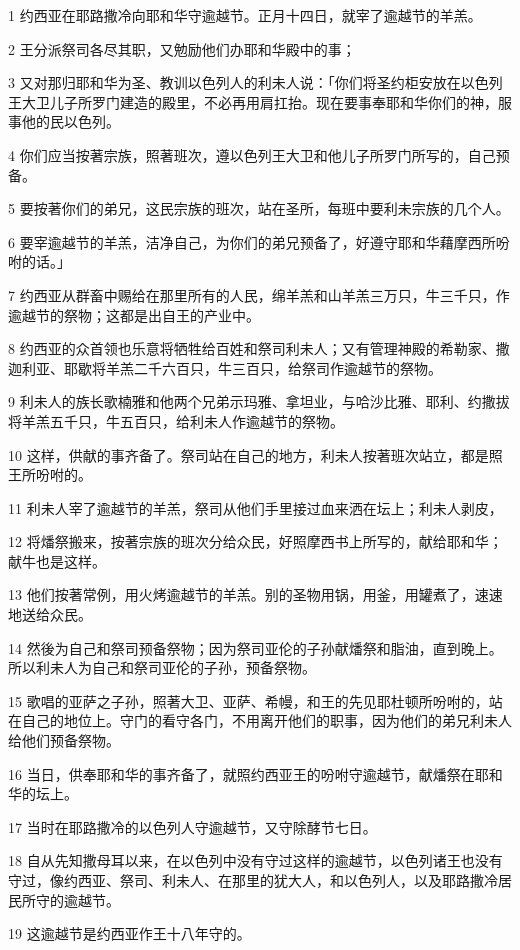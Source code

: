 \par 1 约西亚在耶路撒冷向耶和华守逾越节。正月十四日，就宰了逾越节的羊羔。
\par 2 王分派祭司各尽其职，又勉励他们办耶和华殿中的事；
\par 3 又对那归耶和华为圣、教训以色列人的利未人说：「你们将圣约柜安放在以色列王大卫儿子所罗门建造的殿里，不必再用肩扛抬。现在要事奉耶和华你们的神，服事他的民以色列。
\par 4 你们应当按著宗族，照著班次，遵以色列王大卫和他儿子所罗门所写的，自己预备。
\par 5 要按著你们的弟兄，这民宗族的班次，站在圣所，每班中要利未宗族的几个人。
\par 6 要宰逾越节的羊羔，洁净自己，为你们的弟兄预备了，好遵守耶和华藉摩西所吩咐的话。」
\par 7 约西亚从群畜中赐给在那里所有的人民，绵羊羔和山羊羔三万只，牛三千只，作逾越节的祭物；这都是出自王的产业中。
\par 8 约西亚的众首领也乐意将牺牲给百姓和祭司利未人；又有管理神殿的希勒家、撒迦利亚、耶歇将羊羔二千六百只，牛三百只，给祭司作逾越节的祭物。
\par 9 利未人的族长歌楠雅和他两个兄弟示玛雅、拿坦业，与哈沙比雅、耶利、约撒拔将羊羔五千只，牛五百只，给利未人作逾越节的祭物。
\par 10 这样，供献的事齐备了。祭司站在自己的地方，利未人按著班次站立，都是照王所吩咐的。
\par 11 利未人宰了逾越节的羊羔，祭司从他们手里接过血来洒在坛上；利未人剥皮，
\par 12 将燔祭搬来，按著宗族的班次分给众民，好照摩西书上所写的，献给耶和华；献牛也是这样。
\par 13 他们按著常例，用火烤逾越节的羊羔。别的圣物用锅，用釜，用罐煮了，速速地送给众民。
\par 14 然後为自己和祭司预备祭物；因为祭司亚伦的子孙献燔祭和脂油，直到晚上。所以利未人为自己和祭司亚伦的子孙，预备祭物。
\par 15 歌唱的亚萨之子孙，照著大卫、亚萨、希幔，和王的先见耶杜顿所吩咐的，站在自己的地位上。守门的看守各门，不用离开他们的职事，因为他们的弟兄利未人给他们预备祭物。
\par 16 当日，供奉耶和华的事齐备了，就照约西亚王的吩咐守逾越节，献燔祭在耶和华的坛上。
\par 17 当时在耶路撒冷的以色列人守逾越节，又守除酵节七日。
\par 18 自从先知撒母耳以来，在以色列中没有守过这样的逾越节，以色列诸王也没有守过，像约西亚、祭司、利未人、在那里的犹大人，和以色列人，以及耶路撒冷居民所守的逾越节。
\par 19 这逾越节是约西亚作王十八年守的。
